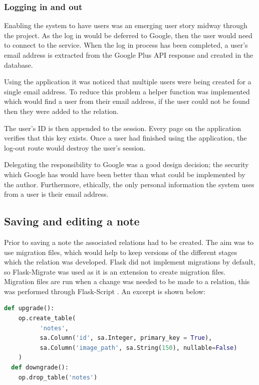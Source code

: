 {{{{{{{\subsubsection{Logging in and out}
Enabling the system to have users was an emerging user story midway through the project. As the log in would be deferred to Google, then the user would need to connect to the service. When the log in process has been completed, a user's email address is extracted from the Google Plus API response and created in the database.

Using the application it was noticed that multiple users were being created for a single email address. To reduce this problem a helper function was implemented which would find a user from their email address, if the user could not be found then they were added to the relation.

The user's ID is then appended to the session. Every page on the application verifies that this key exists. Once a user had finished using the application, the log-out route would destroy the user's session.

Delegating the responsibility to Google was a good design decision; the security which Google has would have been better than what could be implemented by the author. Furthermore, ethically, the only personal information the system uses from a user is their email address.

\subsection{Saving and editing a note}
Prior to saving a note the associated relations had to be created. The aim was to use migration files, which would help to keep versions of the different stages which the relation was developed. Flask did not implement migrations by default, so Flask-Migrate \cite{citeulike:14025941} was used as it is an extension to create migration files. Migration files are run when a change was needed to be made to a relation, this was performed through Flask-Script \cite{citeulike:14025943}. An excerpt is shown below:

\begin{lstlisting}[language=python, caption={An excerpt of a specific migration file where the note relation was created}, label={migration}, breaklines, columns=fullflexible, keywordstyle=\color{blue}, basicstyle=\normalsize\ttfamily]
  def upgrade():
    op.create_table(
          'notes',
          sa.Column('id', sa.Integer, primary_key = True),
          sa.Column('image_path', sa.String(150), nullable=False)
    )
  def downgrade():
    op.drop_table('notes')
\end{lstlisting}

}}}}}}}
